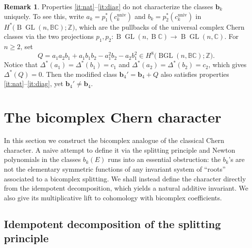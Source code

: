\documentclass[11pt]{amsart}
\newcommand{\BC}{\mathbb{BC}}       %
\newcommand{\C}{\mathbb{C}}          %
\newcommand{\Z}{\mathbb{Z}}
\newcommand{\B}{\operatorname{B}}
\newcommand{\GL}{\operatorname{GL}}  %
\theoremstyle{definition}
\newtheorem{remark}[prop]{Remark}            %
\begin{document}
\begin{remark}\label{rem:axioms_not_unique}
Properties \eqref{it:nat}--\eqref{it:diag} do not characterize the classes $\mathbf{b}_{k}$ uniquely.
To see this, write  $a_{k}=p_{1}^{*}(c_{k}^{\mathrm{univ}})$ and $b_{k}=p_{2}^{*}(c_{k}^{\mathrm{univ}})$ in $H^{*}\bigl(\B\!\GL(n,\BC);\Z)$, which are the pullbacks of the universal complex Chern classes via the two projections
$p_{1},p_{2}\colon\B\!\GL(n,\B\C)\to\B\!\GL(n,\C)$.
For $n\geq 2$, set
\begin{equation*}
Q=a_{1}a_{2}b_{1}+a_{1}b_{1}b_{2}-a_{1}^{2}b_{2}-a_{2}b_{1}^{2}
\in H^{8}\bigl(\operatorname{BGL}(n,\mathbb{B}\mathbb{C});\mathbb{Z}\bigr).
\end{equation*}
Notice that $\Delta^*(a_1)=\Delta^*(b_1)=c_1$ and $\Delta^*(a_2)=\Delta^*(b_2)=c_2$, which gives $\Delta^*(Q)=0$. Then the modified class $\mathbf{b}_{4}'=\mathbf{b}_{4}+Q$ also satisfies properties \eqref{it:nat}--\eqref{it:diag}, yet $\mathbf{b}_{4}'\neq\mathbf{b}_{4}$.
\end{remark}

\section{The bicomplex Chern character}\label{sec:chern-char}

In this section we construct the bicomplex analogue of the classical Chern character.
A naive attempt to define it via the splitting principle and Newton polynomials in the classes $b_k(E)$ runs into an essential obstruction: the $b_k$'s are not the elementary symmetric functions of any invariant system of ``roots'' associated to a bicomplex splitting.  We shall instead define the character directly from the idempotent decomposition, which yields a natural additive invariant.  We also give its multiplicative lift to cohomology with bicomplex coefficients.

\subsection{Idempotent decomposition of the splitting principle}\label{subsec:genuine-splitting}
\end{document}
